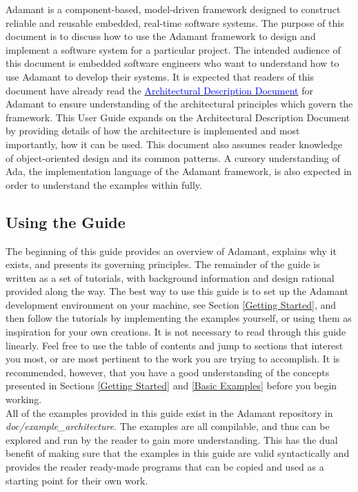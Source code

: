 Adamant is a component-based, model-driven framework designed to construct reliable and reusable embedded, real-time software systems. The purpose of this document is to discuss how to use the Adamant framework to design and implement a software system for a particular project. The intended audience of this document is embedded software engineers who want to understand how to use Adamant to develop their systems. It is expected that readers of this document have already read the \href{https://github.com/lasp/adamant/blob/main/doc/architecture_description_document/architecture_description_document.pdf}{\textcolor{blue}{Architectural Description Document}} for Adamant to ensure understanding of the architectural principles which govern the framework. This User Guide expands on the Architectural Description Document by providing details of how the architecture is implemented and most importantly, how it can be used. This document also assumes reader knowledge of object-oriented design and its common patterns. A cursory understanding of Ada, the implementation language of the Adamant framework, is also expected in order to understand the examples within fully.

\subsection{Using the Guide}

The beginning of this guide provides an overview of Adamant, explains why it exists, and presents its governing principles. The remainder of the guide is written as a set of tutorials, with background information and design rational provided along the way. The best way to use this guide is to set up the Adamant development environment on your machine, see Section \ref{Getting Started}, and then follow the tutorials by implementing the examples yourself, or using them as inspiration for your own creations. It is not necessary to read through this guide linearly. Feel free to use the table of contents and jump to sections that interest you most, or are most pertinent to the work you are trying to accomplish. It is recommended, however, that you have a good understanding of the concepts presented in Sections \ref{Getting Started} and \ref{Basic Examples} before you begin working. \\

All of the examples provided in this guide exist in the Adamant repository in \textit{doc/example\_architecture}. The examples are all compilable, and thus can be explored and run by the reader to gain more understanding. This has the dual benefit of making sure that the examples in this guide are valid syntactically and provides the reader ready-made programs that can be copied and used as a starting point for their own work. \\

